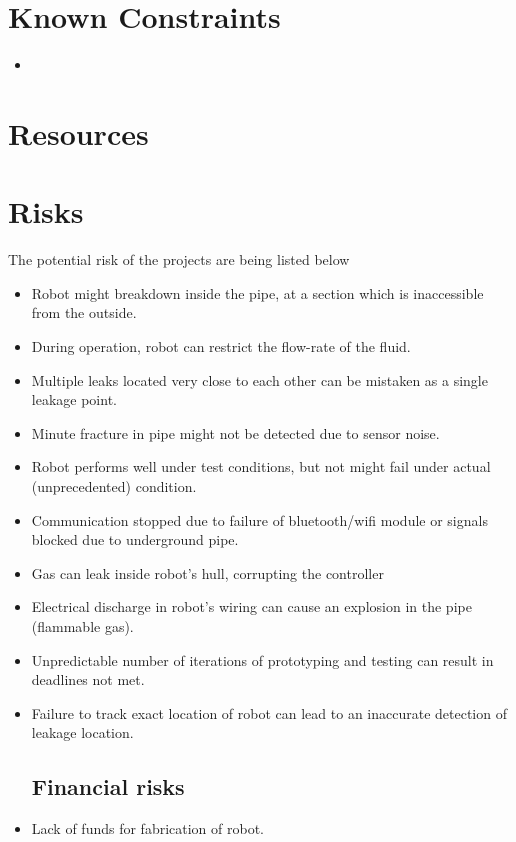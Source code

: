 \documentclass[a4paper]{article}
\begin{document}
\section{Known Constraints}
\begin{itemize}
    \item 
\end{itemize}
\section {Resources}

\section{Risks}
\label{risks}
The potential risk of the projects are being listed below
\begin{itemize}
\subsection{Engineering risks}
    \item{Robot might breakdown inside the pipe, at a section which is inaccessible from the outside.}
    \item {During operation, robot can restrict the flow-rate of the fluid.}
    \item{Multiple leaks located very close to each other can be mistaken as a single leakage point.}
    \item{Minute fracture in pipe might not be detected due to sensor noise.}
    \item{Robot performs well under test conditions, but not might fail under actual (unprecedented) condition.}
    \item{Communication stopped due to failure of bluetooth/wifi module or signals blocked due to underground pipe.}
    \item{Gas can leak inside robot’s hull, corrupting the controller}
    \item{Electrical discharge in robot’s wiring can cause an explosion in the pipe (flammable gas).}
    \item{Unpredictable number of iterations of prototyping and testing can result in deadlines not met.}
    \item{Failure to track exact location of robot can lead to an inaccurate detection of leakage location.}
\subsection{Financial risks}
    \item{Lack of funds for fabrication of robot.}

\end{itemize}
\end{document}
